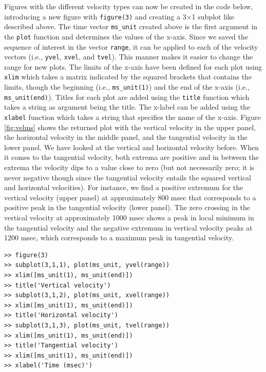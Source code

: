 \documentclass[a4paper, 12pt]{article}
\begin{document}
Figures with the different velocity types can now be created in the code below, introducing a new figure with \texttt{figure(3)} and creating a 3$\times$1 subplot like described above. The time vector \texttt{ms\_unit} created above is the first argument in the \texttt{plot} function and determines the values of the x-axis. Since we saved the sequence of interest in the vector \texttt{range}, it can be applied to each of the velocity vectors (i.e., \texttt{yvel}, \texttt{xvel}, and \texttt{tvel}). This manner makes it easier to change the range for new plots. The limits of the x-axis have been defined for each plot using \texttt{xlim} which takes a matrix indicated by the squared brackets that contains the limits, though the beginning (i.e., \texttt{ms\_unit(1)}) and the end of the x-axis (i.e., \texttt{ms\_unit(end)}). Titles for each plot are added using the \texttt{title} function which takes a string as argument being the title. The x-label can be added using the \texttt{xlabel} function which takes a string that specifies the name of the x-axis. Figure \ref{fig:velms} shows the returned plot with the vertical velocity in the upper panel, the horizontal velocity in the middle panel, and the tangential velocity in the lower panel. We have looked at the vertical and horizontal velocity before. When it comes to the tangential velocity, both extrema are positive and in between the extrema the velocity dips to a value close to zero (but not necessarily zero; it is never negative though since the tangential velocity entails the squared vertical and horizontal velocities). For instance, we find a positive extremum for the vertical velocity (upper panel) at approximately 800 msec that corresponds to a positive peak in the tangential velocity (lower panel). The zero crossing in the vertical velocity at approximately 1000 msec shows a peak in local minimum in the tangential velocity and the negative extremum in vertical velocity peaks at 1200 msec, which corresponds to a maximum peak in tangential velocity. 


\begin{verbatim}
>> figure(3)
>> subplot(3,1,1), plot(ms_unit, yvel(range))
>> xlim([ms_unit(1), ms_unit(end)])
>> title('Vertical velocity')
>> subplot(3,1,2), plot(ms_unit, xvel(range))
>> xlim([ms_unit(1), ms_unit(end)])
>> title('Horizontal velocity')
>> subplot(3,1,3), plot(ms_unit, tvel(range))
>> xlim([ms_unit(1), ms_unit(end)])
>> title('Tangential velocity')
>> xlim([ms_unit(1), ms_unit(end)])
>> xlabel('Time (msec)')
\end{verbatim}
\end{document}
